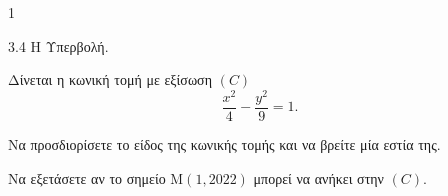 \begin{ylh}{1}
    \item 3.4 Η Υπερβολή.
\end{ylh}
Δίνεται η κωνική τομή με εξίσωση $(C)$
\[ \frac{x^2}{4} - \frac{y^2}{9} = 1. \]
\begin{alist}
\item Να προσδιορίσετε το είδος της κωνικής τομής και να βρείτε μία εστία της. 
\item Να εξετάσετε αν το σημείο $\text{M}(1,2022)$ μπορεί να ανήκει στην $(C)$. 
\end{alist}